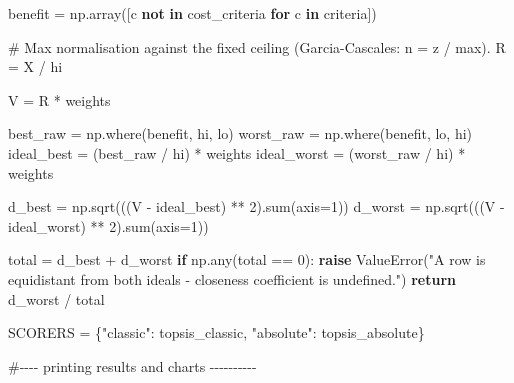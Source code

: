 \documentclass[
  12pt,
  letterpaper,
  12pt,
  oneside,
  english,
  onehalfspacing,
  headsepline]{MastersDoctoralThesis}
\newenvironment{Shaded}{\begin{snugshade}}{\end{snugshade}}
\newcommand{\BuiltInTok}[1]{\textcolor[rgb]{0.00,0.23,0.31}{#1}}
\newcommand{\CommentTok}[1]{\textcolor[rgb]{0.37,0.37,0.37}{#1}}
\newcommand{\ControlFlowTok}[1]{\textcolor[rgb]{0.00,0.23,0.31}{\textbf{#1}}}
\newcommand{\DecValTok}[1]{\textcolor[rgb]{0.68,0.00,0.00}{#1}}
\newcommand{\KeywordTok}[1]{\textcolor[rgb]{0.00,0.23,0.31}{\textbf{#1}}}
\newcommand{\NormalTok}[1]{\textcolor[rgb]{0.00,0.23,0.31}{#1}}
\newcommand{\OperatorTok}[1]{\textcolor[rgb]{0.37,0.37,0.37}{#1}}
\newcommand{\PreprocessorTok}[1]{\textcolor[rgb]{0.68,0.00,0.00}{#1}}
\newcommand{\StringTok}[1]{\textcolor[rgb]{0.13,0.47,0.30}{#1}}
\begin{document}
\begin{Shaded}
\begin{Highlighting}[]
\NormalTok{    benefit }\OperatorTok{=}\NormalTok{ np.array([c }\KeywordTok{not} \KeywordTok{in}\NormalTok{ cost\_criteria }\ControlFlowTok{for}\NormalTok{ c }\KeywordTok{in}\NormalTok{ criteria])}

    \CommentTok{\# Max normalisation against the fixed ceiling (Garcia{-}Cascales: n = z / max).}
\NormalTok{    R }\OperatorTok{=}\NormalTok{ X }\OperatorTok{/}\NormalTok{ hi}

\NormalTok{    V }\OperatorTok{=}\NormalTok{ R }\OperatorTok{*}\NormalTok{ weights}

\NormalTok{    best\_raw }\OperatorTok{=}\NormalTok{ np.where(benefit, hi, lo)}
\NormalTok{    worst\_raw }\OperatorTok{=}\NormalTok{ np.where(benefit, lo, hi)}
\NormalTok{    ideal\_best }\OperatorTok{=}\NormalTok{ (best\_raw }\OperatorTok{/}\NormalTok{ hi) }\OperatorTok{*}\NormalTok{ weights}
\NormalTok{    ideal\_worst }\OperatorTok{=}\NormalTok{ (worst\_raw }\OperatorTok{/}\NormalTok{ hi) }\OperatorTok{*}\NormalTok{ weights}

\NormalTok{    d\_best }\OperatorTok{=}\NormalTok{ np.sqrt(((V }\OperatorTok{{-}}\NormalTok{ ideal\_best) }\OperatorTok{**} \DecValTok{2}\NormalTok{).}\BuiltInTok{sum}\NormalTok{(axis}\OperatorTok{=}\DecValTok{1}\NormalTok{))}
\NormalTok{    d\_worst }\OperatorTok{=}\NormalTok{ np.sqrt(((V }\OperatorTok{{-}}\NormalTok{ ideal\_worst) }\OperatorTok{**} \DecValTok{2}\NormalTok{).}\BuiltInTok{sum}\NormalTok{(axis}\OperatorTok{=}\DecValTok{1}\NormalTok{))}

\NormalTok{    total }\OperatorTok{=}\NormalTok{ d\_best }\OperatorTok{+}\NormalTok{ d\_worst}
    \ControlFlowTok{if}\NormalTok{ np.}\BuiltInTok{any}\NormalTok{(total }\OperatorTok{==} \DecValTok{0}\NormalTok{):}
        \ControlFlowTok{raise} \PreprocessorTok{ValueError}\NormalTok{(}\StringTok{"A row is equidistant from both ideals {-} closeness coefficient is undefined."}\NormalTok{)}
    \ControlFlowTok{return}\NormalTok{ d\_worst }\OperatorTok{/}\NormalTok{ total}



\NormalTok{SCORERS }\OperatorTok{=}\NormalTok{ \{}\StringTok{"classic"}\NormalTok{: topsis\_classic, }\StringTok{"absolute"}\NormalTok{: topsis\_absolute\}}

\CommentTok{\#{-}{-}{-}{-} printing results and charts {-}{-}{-}{-}{-}{-}{-}{-}{-}{-}}


\end{Highlighting}
\end{Shaded}
\end{document}
